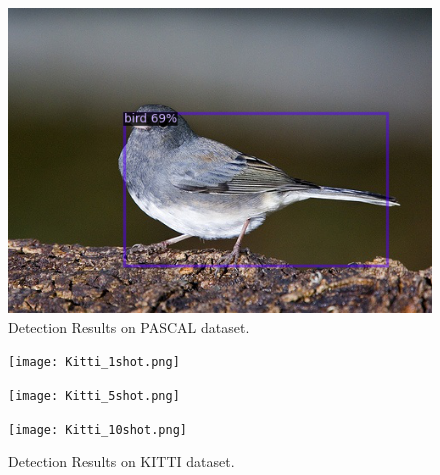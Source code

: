 \documentclass{article}
\begin{document}
\begin{figure}[h!]
\begin{minipage}{0.31\textwidth}
  \includegraphics[width=\textwidth, height=0.17\textheight]{./../../final_results/Pascal/000148_10shot.png}
  \end{minipage}
  \caption{Detection Results on PASCAL dataset. }
  \label{pascal_results}
\end{figure}


\begin{figure}[h!]
  \centering
  \begin{minipage}{0.33\textwidth}
  \texttt{[image: Kitti\_1shot.png]}
  \end{minipage}
  \begin{minipage}{0.33\textwidth}
  \texttt{[image: Kitti\_5shot.png]}
  \end{minipage}
  \begin{minipage}{0.31\textwidth}
  \texttt{[image: Kitti\_10shot.png]}
  \end{minipage}
  \caption{Detection Results on KITTI dataset. }
  \label{kitti_plots}
\end{figure}
\end{document}
